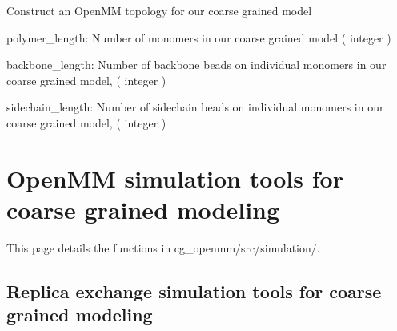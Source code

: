 \documentclass[letterpaper,12pt,english,openany,oneside]{sphinxmanual}
\begin{document}

\begin{fulllineitems}
\label{\detokenize{build:build.cg_build.build_topology}}
Construct an OpenMM topology for our coarse grained model

polymer\_length: Number of monomers in our coarse grained model
( integer )

backbone\_length: Number of backbone beads on individual monomers
in our coarse grained model, ( integer )

sidechain\_length: Number of sidechain beads on individual monomers
in our coarse grained model, ( integer )

\end{fulllineitems}



\chapter{OpenMM simulation tools for coarse grained modeling}
\label{\detokenize{simulation:openmm-simulation-tools-for-coarse-grained-modeling}}\label{\detokenize{simulation::doc}}
This page details the functions in cg\_openmm/src/simulation/.


\section{Replica exchange simulation tools for coarse grained modeling}
\label{\detokenize{simulation:module-simulation.rep_exch}}\label{\detokenize{simulation:replica-exchange-simulation-tools-for-coarse-grained-modeling}}
\end{document}
